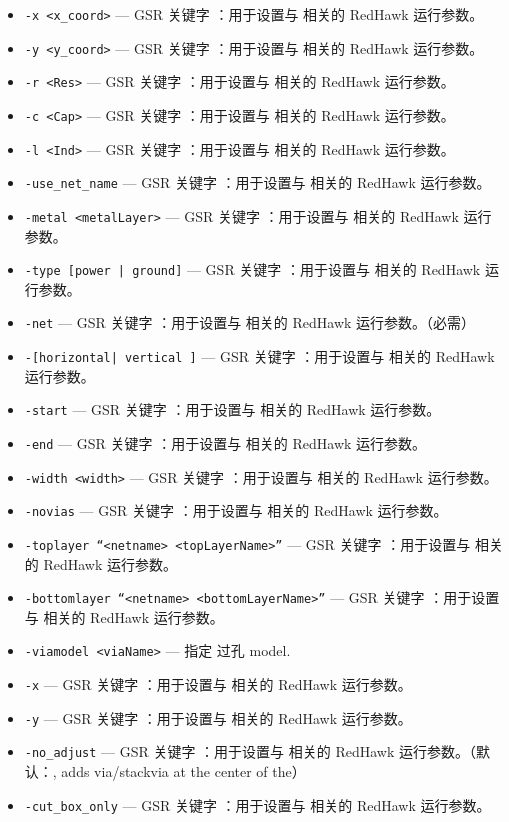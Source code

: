 \begin{itemize}
\item \texttt{-x <x\_coord>} — GSR 关键字 ：用于设置与  相关的 RedHawk 运行参数。
\item \texttt{-y <y\_coord>} — GSR 关键字 ：用于设置与  相关的 RedHawk 运行参数。
\item \texttt{-r <Res>} — GSR 关键字 ：用于设置与  相关的 RedHawk 运行参数。
\item \texttt{-c <Cap>} — GSR 关键字 ：用于设置与  相关的 RedHawk 运行参数。
\item \texttt{-l <Ind>} — GSR 关键字 ：用于设置与  相关的 RedHawk 运行参数。
\item \texttt{-use\_net\_name} — GSR 关键字 ：用于设置与  相关的 RedHawk 运行参数。
\item \texttt{-metal <metalLayer>} — GSR 关键字 ：用于设置与  相关的 RedHawk 运行参数。
\item \texttt{-type [power | ground]} — GSR 关键字 ：用于设置与  相关的 RedHawk 运行参数。
\item \texttt{-net} — GSR 关键字 ：用于设置与  相关的 RedHawk 运行参数。（必需）
\item \texttt{-[horizontal| vertical ]} — GSR 关键字 ：用于设置与  相关的 RedHawk 运行参数。
\item \texttt{-start} — GSR 关键字 ：用于设置与  相关的 RedHawk 运行参数。
\item \texttt{-end} — GSR 关键字 ：用于设置与  相关的 RedHawk 运行参数。
\item \texttt{-width <width>} — GSR 关键字 ：用于设置与  相关的 RedHawk 运行参数。
\item \texttt{-novias} — GSR 关键字 ：用于设置与  相关的 RedHawk 运行参数。
\item \texttt{-toplayer “<netname> <topLayerName>”} — GSR 关键字 ：用于设置与  相关的 RedHawk 运行参数。
\item \texttt{-bottomlayer “<netname> <bottomLayerName>”} — GSR 关键字 ：用于设置与  相关的 RedHawk 运行参数。
\item \texttt{-viamodel <viaName>} — 指定 过孔 model.
\item \texttt{-x} — GSR 关键字 ：用于设置与  相关的 RedHawk 运行参数。
\item \texttt{-y} — GSR 关键字 ：用于设置与  相关的 RedHawk 运行参数。
\item \texttt{-no\_adjust} — GSR 关键字 ：用于设置与  相关的 RedHawk 运行参数。（默认：, adds via/stackvia at the center of the）
\item \texttt{-cut\_box\_only} — GSR 关键字 ：用于设置与  相关的 RedHawk 运行参数。

\end{itemize}
